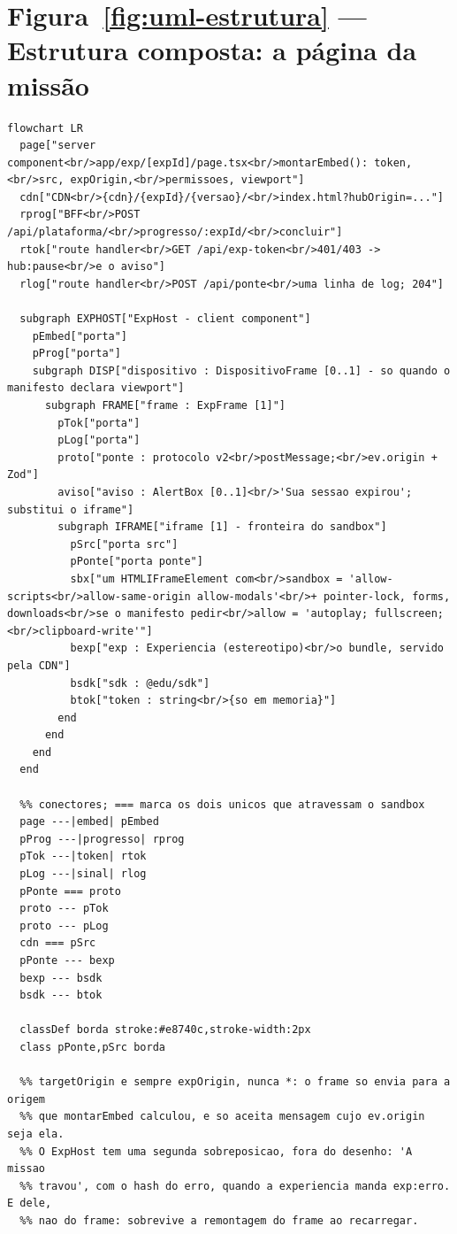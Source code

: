 \section{Figura~\ref{fig:uml-estrutura} --- Estrutura composta: a página da missão}

\begin{lstlisting}[language=mermaid]
%% aproximacao: o Mermaid nao tem diagrama de estrutura composta; as partes viram subgraphs aninhados e nos, as portas viram nos pequenos dentro da parte a que pertencem, e a fronteira do sandbox e o subgraph do iframe.
flowchart LR
  page["server component<br/>app/exp/[expId]/page.tsx<br/>montarEmbed(): token,<br/>src, expOrigin,<br/>permissoes, viewport"]
  cdn["CDN<br/>{cdn}/{expId}/{versao}/<br/>index.html?hubOrigin=..."]
  rprog["BFF<br/>POST /api/plataforma/<br/>progresso/:expId/<br/>concluir"]
  rtok["route handler<br/>GET /api/exp-token<br/>401/403 -> hub:pause<br/>e o aviso"]
  rlog["route handler<br/>POST /api/ponte<br/>uma linha de log; 204"]

  subgraph EXPHOST["ExpHost - client component"]
    pEmbed["porta"]
    pProg["porta"]
    subgraph DISP["dispositivo : DispositivoFrame [0..1] - so quando o manifesto declara viewport"]
      subgraph FRAME["frame : ExpFrame [1]"]
        pTok["porta"]
        pLog["porta"]
        proto["ponte : protocolo v2<br/>postMessage;<br/>ev.origin + Zod"]
        aviso["aviso : AlertBox [0..1]<br/>'Sua sessao expirou'; substitui o iframe"]
        subgraph IFRAME["iframe [1] - fronteira do sandbox"]
          pSrc["porta src"]
          pPonte["porta ponte"]
          sbx["um HTMLIFrameElement com<br/>sandbox = 'allow-scripts<br/>allow-same-origin allow-modals'<br/>+ pointer-lock, forms, downloads<br/>se o manifesto pedir<br/>allow = 'autoplay; fullscreen;<br/>clipboard-write'"]
          bexp["exp : Experiencia (estereotipo)<br/>o bundle, servido pela CDN"]
          bsdk["sdk : @edu/sdk"]
          btok["token : string<br/>{so em memoria}"]
        end
      end
    end
  end

  %% conectores; === marca os dois unicos que atravessam o sandbox
  page ---|embed| pEmbed
  pProg ---|progresso| rprog
  pTok ---|token| rtok
  pLog ---|sinal| rlog
  pPonte === proto
  proto --- pTok
  proto --- pLog
  cdn === pSrc
  pPonte --- bexp
  bexp --- bsdk
  bsdk --- btok

  classDef borda stroke:#e8740c,stroke-width:2px
  class pPonte,pSrc borda

  %% targetOrigin e sempre expOrigin, nunca *: o frame so envia para a origem
  %% que montarEmbed calculou, e so aceita mensagem cujo ev.origin seja ela.
  %% O ExpHost tem uma segunda sobreposicao, fora do desenho: 'A missao
  %% travou', com o hash do erro, quando a experiencia manda exp:erro. E dele,
  %% nao do frame: sobrevive a remontagem do frame ao recarregar.
\end{lstlisting}

